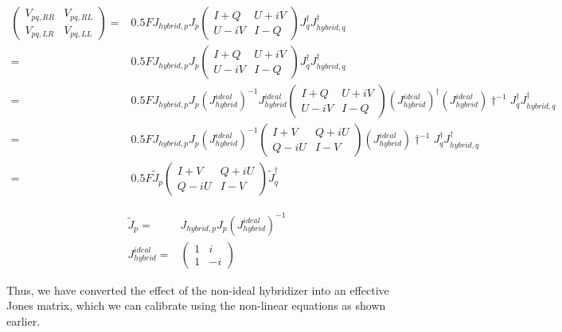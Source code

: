 \documentclass{article}
\begin{document}
\begin{equation}
\begin{aligned}
\begin{pmatrix}
V_{pq,RR} & V_{pq,RL}\\
V_{pq,LR} & V_{pq,LL}
\end{pmatrix}=&0.5 F J_{hybrid,p} J_p 
\begin{pmatrix}
I+Q & U+iV\\
U-iV & I-Q
\end{pmatrix} J_q^\dagger J_{hybrid,q}^\dagger\\
= & 0.5 F J_{hybrid,p} J_p 
\begin{pmatrix}
I+Q & U+iV\\
U-iV & I-Q
\end{pmatrix} J_q^\dagger J_{hybrid,q}^\dagger\\
= & 0.5 F J_{hybrid,p} J_p \left (J_{hybrid}^{ideal}\right )^{-1} J_{hybrid}^{ideal}
\begin{pmatrix}
I+Q & U+iV\\
U-iV & I-Q
\end{pmatrix} \left ( J_{hybrid}^{ideal}\right )^\dagger \left (J_{hybrid}^{ideal}\right )\dagger ^{-1} J_q^\dagger J_{hybrid,q}^\dagger\\
=& 0.5 F J_{hybrid,p} J_p \left (J_{hybrid}^{ideal}\right )^{-1} 
\begin{pmatrix}
I+V & Q+iU\\
Q-iU & I-V
\end{pmatrix} \left (J_{hybrid}^{ideal}\right )\dagger ^{-1} J_q^\dagger J_{hybrid,q}^\dagger \\
=&0.5 F \tilde{J}_p 
\begin{pmatrix}
I+V & Q+iU\\
Q-iU & I-V
\end{pmatrix} \tilde{J}_q^\dagger 
\end{aligned}
\end{equation}

\begin{align}
\tilde{J}_p= & J_{hybrid,p} J_p \left (J_{hybrid}^{ideal}\right )^{-1} \\
J_{hybrid}^{ideal} = & \begin{pmatrix}
1 & i\\
1 & -i
\end{pmatrix} 
\end{align}

Thus, we have converted the effect of the non-ideal hybridizer into an effective Jones matrix, which we can calibrate using the non-linear equations as shown earlier.
\end{document}
